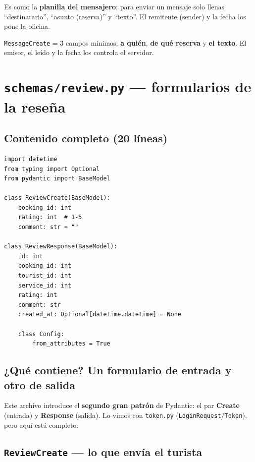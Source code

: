 \documentclass[11pt,a4paper]{article}
\begin{document}
\begin{analogia}
Es como la \textbf{planilla del mensajero}: para enviar un mensaje solo llenas ``destinatario'',
``asunto (reserva)'' y ``texto''. El remitente (sender) y la fecha los pone la oficina.
\end{analogia}

\begin{recuadro}
\texttt{MessageCreate} = 3 campos mínimos: \textbf{a quién}, \textbf{de qué reserva} y
\textbf{el texto}. El emisor, el leído y la fecha los controla el servidor.
\end{recuadro}

\section{\texttt{schemas/review.py} --- formularios de la reseña}

\subsection{Contenido completo (20 líneas)}

\begin{lstlisting}
import datetime
from typing import Optional
from pydantic import BaseModel

class ReviewCreate(BaseModel):
    booking_id: int
    rating: int  # 1-5
    comment: str = ""

class ReviewResponse(BaseModel):
    id: int
    booking_id: int
    tourist_id: int
    service_id: int
    rating: int
    comment: str
    created_at: Optional[datetime.datetime] = None

    class Config:
        from_attributes = True
\end{lstlisting}

\subsection{¿Qué contiene? Un formulario de \textbf{entrada} y otro de \textbf{salida}}

Este archivo introduce el \textbf{segundo gran patrón} de Pydantic: el par
\textbf{Create} (entrada) y \textbf{Response} (salida). Lo vimos con \texttt{token.py}
(\texttt{LoginRequest}/\texttt{Token}), pero aquí está completo.

\subsection{\texttt{ReviewCreate} --- lo que envía el turista}
\end{document}
